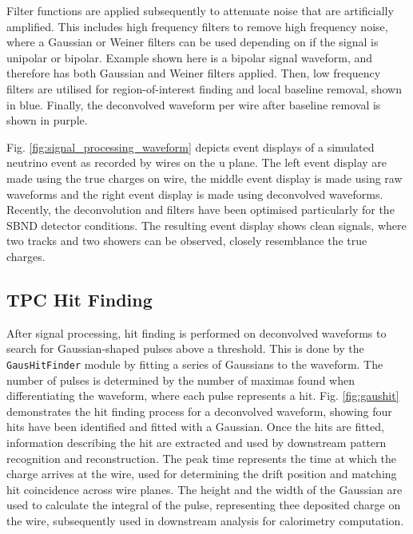 Filter functions are applied subsequently to attenuate noise that are artificially amplified.
This includes high frequency filters to remove high frequency noise, where a Gaussian or Weiner filters can be used depending on if the signal is unipolar or bipolar.
Example shown here is a bipolar signal waveform, and therefore has both Gaussian and Weiner filters applied.
Then, low frequency filters are utilised for region-of-interest finding and local baseline removal, shown in blue.
Finally, the deconvolved waveform per wire after baseline removal is shown in purple.

Fig. \ref{fig:signal_processing_waveform} depicts event displays of a simulated neutrino event as recorded by wires on the u plane.
The left event display are made using the true charges on wire, the middle event display is made using raw waveforms and the right event display is made using deconvolved waveforms.
Recently, the deconvolution and filters have been optimised particularly for the SBND detector conditions.
The resulting event display shows clean signals, where two tracks and two showers can be observed, closely resemblance the true charges. 

\subsection{TPC Hit Finding}
After signal processing, hit finding is performed on deconvolved waveforms to search for Gaussian-shaped pulses above a threshold.
This is done by the \texttt{GausHitFinder} module \cite{gaushitfinder} by fitting a series of Gaussians to the waveform.
The number of pulses is determined by the number of maximas found when differentiating the waveform, where each pulse represents a hit.
Fig. \ref{fig:gaushit} \cite{EdPhD} demonstrates the hit finding process for a deconvolved waveform, showing four hits have been identified and fitted with a Gaussian.
Once the hits are fitted, information describing the hit are extracted and used by downstream pattern recognition and reconstruction.
The peak time represents the time at which the charge arrives at the wire, used for determining the drift position and matching hit coincidence across wire planes.
The height and the width of the Gaussian are used to calculate the integral of the pulse, representing thee deposited charge on the wire, subsequently used in downstream analysis for calorimetry computation.

